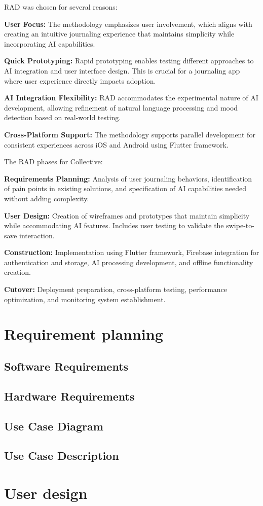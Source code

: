 RAD was chosen for several reasons:

\textbf{User Focus:} The methodology emphasizes user involvement, which aligns with creating an intuitive journaling experience that maintains simplicity while incorporating AI capabilities.

\textbf{Quick Prototyping:} Rapid prototyping enables testing different approaches to AI integration and user interface design. This is crucial for a journaling app where user experience directly impacts adoption.

\textbf{AI Integration Flexibility:} RAD accommodates the experimental nature of AI development, allowing refinement of natural language processing and mood detection based on real-world testing.

\textbf{Cross-Platform Support:} The methodology supports parallel development for consistent experiences across iOS and Android using Flutter framework.

The RAD phases for Collective:

\textbf{Requirements Planning:} Analysis of user journaling behaviors, identification of pain points in existing solutions, and specification of AI capabilities needed without adding complexity.

\textbf{User Design:} Creation of wireframes and prototypes that maintain simplicity while accommodating AI features. Includes user testing to validate the swipe-to-save interaction.

\textbf{Construction:} Implementation using Flutter framework, Firebase integration for authentication and storage, AI processing development, and offline functionality creation.

\textbf{Cutover:} Deployment preparation, cross-platform testing, performance optimization, and monitoring system establishment.

\section{Requirement planning}\label{sec:requirementPlanning}   
\subsection{Software Requirements}\label{subsec:softwareRequirements}
\subsection{Hardware Requirements}\label{subsec:hardwareRequirements}
\subsection{Use Case Diagram}\label{subsec:usecaseDiagram}
\subsection{Use Case Description}\label{subsec:usecaseDescription}

\section{User design}\label{sec:userDesign}